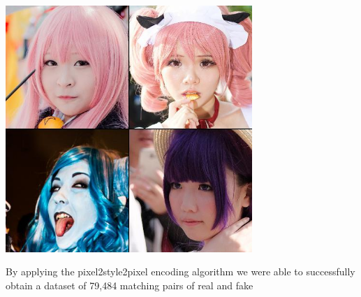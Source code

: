 \documentclass[11pt, letterpaper]{article}
\newenvironment{Figure}
  {\par\medskip\noindent\minipage{\linewidth}}
  {\endminipage\par\medskip}
\begin{document}
\begin{multicols}{2}
  \begin{Figure}
    \centering
    \includegraphics[width=0.7\textwidth]{figures/false-negatives.jpg}
    \label{falseneg}
  \end{Figure}

  By applying the pixel2style2pixel encoding algorithm we were able to
  successfully obtain a dataset of 79,484 matching pairs of real and fake


\end{multicols}
\end{document}
